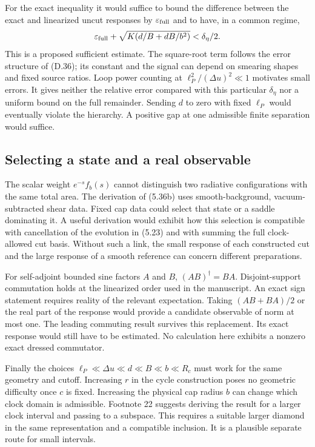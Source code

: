 \documentclass[11pt]{article}
\begin{document}
For the exact inequality it would suffice to bound the difference between the exact and linearized uncut responses by $\varepsilon_{\rm full}$ and to have, in a common regime,
\[
 \varepsilon_{\rm full}+\sqrt{K(d/B+dB/b^2)}<\delta_\eta/2 .
\]
This is a proposed sufficient estimate. The square-root term follows the error structure of (D.36); its constant and the signal can depend on smearing shapes and fixed source ratios. Loop power counting at $\ell_P^2/(\Delta u)^2\ll1$ motivates small errors. It gives neither the relative error compared with this particular $\delta_\eta$ nor a uniform bound on the full remainder. Sending $d$ to zero with fixed $\ell_P$ would eventually violate the hierarchy. A positive gap at one admissible finite separation would suffice.

\subsection{Selecting a state and a real observable}
The scalar weight $e^{-s}f_b(s)$ cannot distinguish two radiative configurations with the same total area. The derivation of (5.36b) uses smooth-background, vacuum-subtracted shear data. Fixed cap data could select that state or a saddle dominating it. A useful derivation would exhibit how this selection is compatible with cancellation of the evolution in (5.23) and with summing the full clock-allowed cut basis. Without such a link, the small response of each constructed cut and the large response of a smooth reference can concern different preparations.

For self-adjoint bounded sine factors $A$ and $B$, $(AB)^\dagger=BA$. Disjoint-support commutation holds at the linearized order used in the manuscript. An exact sign statement requires reality of the relevant expectation. Taking $(AB+BA)/2$ or the real part of the response would provide a candidate observable of norm at most one. The leading commuting result survives this replacement. Its exact response would still have to be estimated. No calculation here exhibits a nonzero exact dressed commutator.

Finally the choices $\ell_P\ll\Delta u\ll d\ll B\ll b\ll R_c$ must work for the same geometry and cutoff. Increasing $r$ in the cycle construction poses no geometric difficulty once $c$ is fixed. Increasing the physical cap radius $b$ can change which clock domain is admissible. Footnote 22 suggests deriving the result for a larger clock interval and passing to a subspace. This requires a suitable larger diamond in the same representation and a compatible inclusion. It is a plausible separate route for small intervals.
\end{document}
